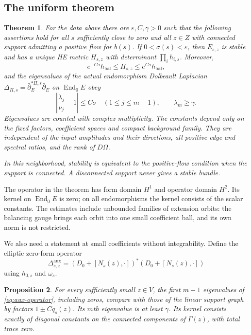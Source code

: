 \documentclass[11pt]{amsart}
\newtheorem{theorem}{Theorem}[section]
\newtheorem{proposition}[theorem]{Proposition}
\theoremstyle{definition}
\theoremstyle{remark}
\newcommand{\End}{\operatorname{End}}
\begin{document}
\subsection{The uniform theorem}
\begin{theorem}\label{thm:uniform}
For the data above there are $\varepsilon,C,\gamma>0$ such that the
following assertions hold for all $s$ sufficiently close to zero and
all $z\in Z$ with connected support admitting a positive flow for $b(s)$.
If $0<\sigma(s)<\varepsilon$, then $E_{s,z}$ is stable and has a unique
HE metric $H_{s,z}$ with determinant $\prod_i h_{i,s}$. Moreover,
\begin{equation}\label{eq:main-metric}
 e^{-C\sigma}h_{\mathrm{bal}}\le H_{s,z}
       \le e^{C\sigma}h_{\mathrm{bal}},
\end{equation}
and the eigenvalues of the actual endomorphism Dolbeault Laplacian
$\Delta_{H,s}=\bar\partial_E^{*H,s}\bar\partial_E$ on $\End_0E$ obey
\begin{equation}\label{eq:main-spectrum}
 \left|\frac{\lambda_j}{\nu_j}-1\right|\le C\sigma
 \quad(1\le j\le m-1),\qquad \lambda_m\ge\gamma.
\end{equation}
Eigenvalues are counted with complex multiplicity. The constants depend
only on the fixed factors, coefficient spaces and compact background
family. They are independent of the input amplitudes and their directions,
all positive edge and spectral ratios, and the rank of $D\Omega$.

In this neighborhood, stability is equivalent to the positive-flow
condition when the support is connected. A disconnected support never
gives a stable bundle.
\end{theorem}

The operator in the theorem has form domain $H^1$ and operator domain
$H^2$. Its kernel on $\End_0E$ is zero; on all endomorphisms the kernel
consists of the scalar constants. The estimates include unbounded families
of extension orbits: the balancing gauge brings each orbit into one small
coefficient ball, and its own norm is not restricted.

We also need a statement at small coefficients without integrability.
Define the elliptic zero-form operator
\begin{equation}\label{eq:aux-operator}
 \Delta^{\mathrm{aux}}_{s,z}
  =(D_0+[N_s(z),\cdot])^*(D_0+[N_s(z),\cdot])
\end{equation}
using $h_{0,s}$ and $\omega_s$.

\begin{proposition}\label{prop:aux-spectrum}
For every sufficiently small $z\in V$, the first $m-1$ eigenvalues of
\eqref{eq:aux-operator}, including zeros, compare with those of the linear
support graph by factors $1\pm Cq_s(z)$. Its $m$th eigenvalue is at least
$\gamma$. Its kernel consists exactly of diagonal constants on the connected
components of $\Gamma(z)$, with total trace zero.
\end{proposition}
\end{document}
